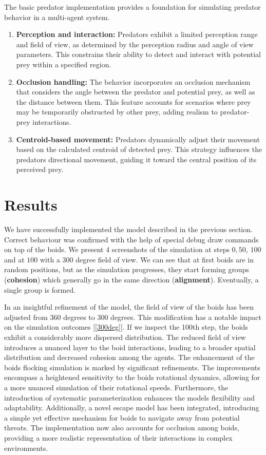 \documentclass[9pt]{pnas-new}
\begin{document}
The basic predator implementation provides a foundation for simulating predator behavior in a multi-agent system.
\begin{enumerate}
	\item \textbf{Perception and interaction:}
	Predators exhibit a limited perception range and field of view, as determined by the perception radius and angle of view parameters. 
	This constrains their ability to detect and interact with potential prey within a specified region.
	\item \textbf{Occlusion handling:}
	The behavior incorporates an occlusion mechanism that considers the angle between the predator and potential prey, as well as the distance between them. 
	This feature accounts for scenarios where prey may be temporarily obstructed by other prey, adding realism to predator-prey interactions.
	\item \textbf{Centroid-based movement:}
	Predators dynamically adjust their movement based on the calculated centroid of detected prey. 
	This strategy influences the predators directional movement, guiding it toward the central position of its perceived prey.
\end{enumerate}


\section*{Results}
We have successfully implemented the model described in the previous section.
Correct behaviour was confirmed with the help of special debug draw commands on top of the boids.
We present 4 screenshots of the simulation at steps $0, 50$, $100$ and at $100$ with a 300 degree field of view.
We can see that at first boids are in random positions, but as the simulation progresses, they start forming groups (\textbf{cohesion}) which generally go in the same direction (\textbf{alignment}).
Eventually, a single group is formed.

In an insightful refinement of the model, the field of view of the boids has been adjusted from 360 degrees to 300 degrees. 
This modification has a notable impact on the simulation outcomes [\ref{300deg}]. If we inspect the 100th step, the boids exhibit a considerably more dispersed distribution. 
The reduced field of view introduces a nuanced layer to the boid interactions, leading to a broader spatial distribution and decreased cohesion among the agents.
The enhancement of the boids flocking simulation is marked by significant refinements. 
The improvements encompass a heightened sensitivity to the boids rotational dynamics, allowing for a more nuanced simulation of their rotational speeds. 
Furthermore, the introduction of systematic parameterization enhances the models flexibility and adaptability. 
Additionally, a novel escape model has been integrated, introducing a simple yet effective mechanism for boids to navigate away from potential threats. 
The implementation now also accounts for occlusion among boids, providing a more realistic representation of their interactions in complex environments.
\end{document}
